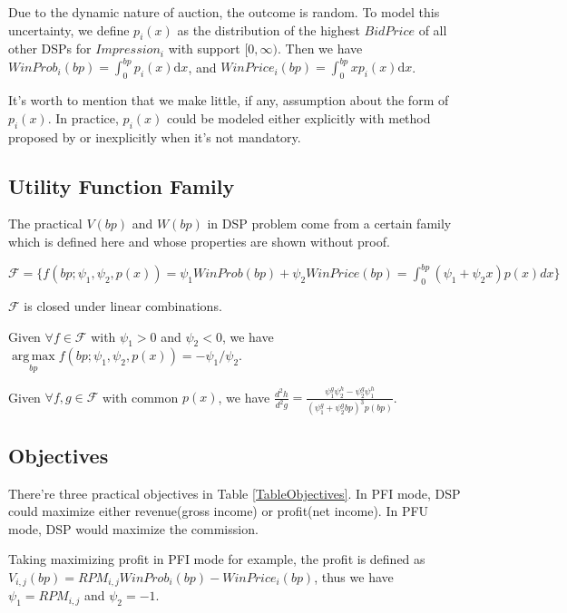 \documentclass[sigconf]{acmart}
\DeclareMathOperator*{\argmax}{arg\,max}
\newcommand{\sV}{V_{i,j}}
\newcommand{\sRPM}{RPM_{i,j}}
\newcommand{\pprob}{\psi_1}
\newcommand{\pprice}{\psi_2}
\newcommand{\uff}{\mathscr{F}}
\newcommand{\uf}{f(bp; \pprob, \pprice, p(x))}
\begin{document}
Due to the dynamic nature of auction, the outcome is random.
To model this uncertainty, we define $p_i(x)$ as
   the distribution of the highest $BidPrice$ of all other DSPs for $Impression_i$ with support $[0, \infty)$.
Then we have $WinProb_i(bp)=\int_0^{bp} p_i(x) \mathrm{d} x$, and $WinPrice_i(bp)=\int_0^{bp} x p_i(x) \mathrm{d} x$.

It's worth to mention that we make little, if any, assumption about the form of $p_i(x)$.
In practice, $p_i(x)$ could be modeled either explicitly with method proposed by \cite{Wu2015} or inexplicitly when it's not mandatory.

\subsection{Utility Function Family}

The practical $V(bp)$ and $W(bp)$ in DSP problem come from a certain family
    which is defined here and whose properties are shown without proof.

\begin{definition}
$\uff = \{ \uf = \pprob WinProb(bp) + \pprice WinPrice(bp) = \int_0^{bp} (\pprob + \pprice x)p(x)dx \} $
\end{definition}

\begin{theorem}
$\uff$ is closed under linear combinations.
\end{theorem}

\begin{theorem}
Given $\forall f \in \uff$ with $\pprob > 0$ and $\pprice < 0$, we have $\argmax\limits_{bp} \uf = - \pprob / \pprice$.
\end{theorem}

\begin{theorem}
Given $\forall f,g \in \uff$ with common $p(x)$,
    we have $\frac{d^2h}{d^2g} = \frac{\pprob^g \pprice^h - \pprice^g \pprob^h}{(\pprob^g + \pprice^g bp)^3 p(bp)}$.
\end{theorem}

\subsection{Objectives}

There're three practical objectives in Table \ref{TableObjectives}.
In PFI mode, DSP could maximize either revenue(gross income) or profit(net income).
In PFU mode, DSP would maximize the commission. 

Taking maximizing profit in PFI mode for example, the profit is defined as $\sV(bp)=\sRPM{}WinProb_i(bp)-WinPrice_i(bp)$,
    thus we have $\pprob=\sRPM$ and $\pprice=-1$.
\end{document}
